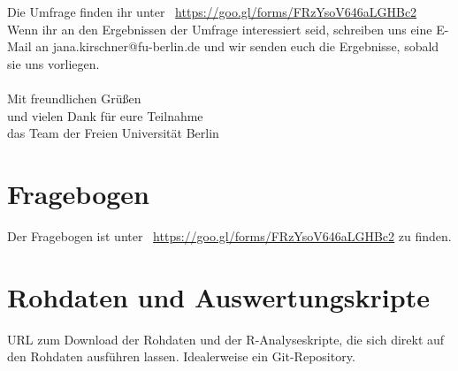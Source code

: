 \documentclass[de]{agse-empir-report}\usepackage[]{graphicx}\usepackage[]{color}
\begin{document}
Die Umfrage finden ihr  unter ~\url{https://goo.gl/forms/FRzYsoV646aLGHBc2} \\

Wenn ihr an den Ergebnissen der Umfrage interessiert seid, schreiben uns eine E-Mail an jana.kirschner@fu-berlin.de und wir senden euch die Ergebnisse, sobald sie uns vorliegen.\\ \\

Mit freundlichen Grüßen\\
und vielen Dank für eure Teilnahme\\ 
das Team der Freien Universität Berlin\\



\section{Fragebogen}

Der Fragebogen ist unter ~\url{https://goo.gl/forms/FRzYsoV646aLGHBc2} zu finden.


\section{Rohdaten und Auswertungskripte}

URL zum Download der Rohdaten und der R-Analyseskripte, die sich direkt auf den
Rohdaten ausführen lassen.
Idealerweise ein Git-Repository.
\end{document}
